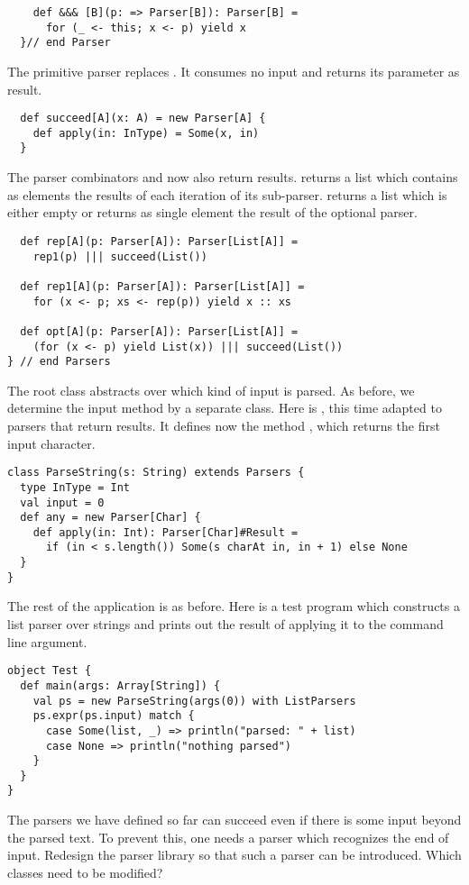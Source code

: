 {{\begin{lstlisting}
    def &&& [B](p: => Parser[B]): Parser[B] =
      for (_ <- this; x <- p) yield x
  }// end Parser
\end{lstlisting}

The primitive parser  replaces . It consumes
no input and returns its parameter as result.
\begin{lstlisting}
  def succeed[A](x: A) = new Parser[A] {
    def apply(in: InType) = Some(x, in)
  }
\end{lstlisting}

The parser combinators  and  now also return
results.  returns a list which contains as elements the
results of each iteration of its sub-parser.  returns a list
which is either empty or returns as single element the result of the
optional parser.
\begin{lstlisting}
  def rep[A](p: Parser[A]): Parser[List[A]] =
    rep1(p) ||| succeed(List())

  def rep1[A](p: Parser[A]): Parser[List[A]] =
    for (x <- p; xs <- rep(p)) yield x :: xs

  def opt[A](p: Parser[A]): Parser[List[A]] =
    (for (x <- p) yield List(x)) ||| succeed(List())
} // end Parsers
\end{lstlisting}
The root class  abstracts over which kind of
input is parsed.  As before, we determine the input method by a separate class.
Here is , this time adapted to parsers that return results.
It defines now the method , which returns the first input character.
\begin{lstlisting}
class ParseString(s: String) extends Parsers {
  type InType = Int
  val input = 0
  def any = new Parser[Char] {
    def apply(in: Int): Parser[Char]#Result =
      if (in < s.length()) Some(s charAt in, in + 1) else None
  }
}
\end{lstlisting}
The rest of the application is as before. Here is a test program which
constructs a list parser over strings and prints out the result of
applying it to the command line argument.
\begin{lstlisting}
object Test {
  def main(args: Array[String]) {
    val ps = new ParseString(args(0)) with ListParsers
    ps.expr(ps.input) match {
      case Some(list, _) => println("parsed: " + list)
      case None => println("nothing parsed")
    }
  }
}
\end{lstlisting}

\begin{exercise}\label{exercise:end-marker} The parsers we have defined so
far can succeed even if there is some input beyond the parsed text. To
prevent this, one needs a parser which recognizes the end of input.
Redesign the parser library so that such a parser can be introduced.
Which classes need to be modified?
\end{exercise}
}

}
